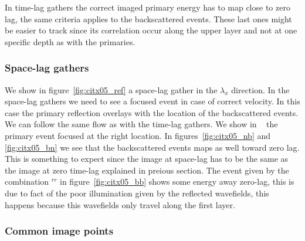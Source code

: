 In time-lag gathers the correct imaged primary energy has to map close to zero lag, the same criteria applies 
to the backscattered events. These last ones might be easier to track since its correlation occur along the upper layer 
and not at one specific depth as with the primaries. 



\subsubsection{Space-lag gathers}

We show in figure~\ref{fig:citx05_ref} a space-lag gather in the $\lambda_x$ direction. In the space-lag gathers we need to see
a focused event in case of correct velocity. In this case the primary reflection overlays with the location of the 
backscattered events. We can follow the same flow as with the time-lag gathers. We show in ~ the primary event focused
at the right location. In figures~\ref{fig:citx05_nb} and \ref{fig:citx05_bn} we see that the backscattered events maps as well toward
zero lag. This is something to expect since the image at space-lag has to be the same as the image at zero time-lag explained in
preious section. The event given by the combination $^{rr}$ in figure~\ref{fig:citx05_bb} shows some energy away zero-lag, this is
due to fact of the poor illumination given by the reflected wavefields, this happens because this wavefields only travel along
the first layer.

\subsubsection{Common image points}




